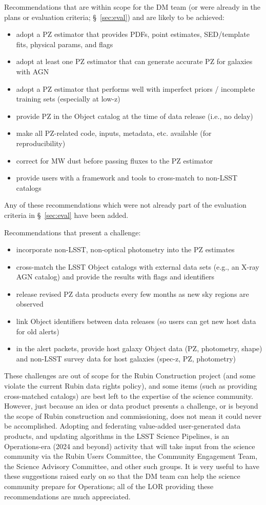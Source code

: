\documentclass[DM,authoryear,toc]{lsstdoc}
\begin{document}
Recommendations that are within scope for the DM team (or were already in the plans or evaluation criteria; \S~\ref{sec:eval}) and are likely to be achieved:
\begin{itemize}
\item adopt a PZ estimator that provides PDFs, point estimates, SED/template fits, physical params, and flags
\item adopt at least one PZ estimator that can generate accurate PZ for galaxies with AGN
\item adopt a PZ estimator that performs well with imperfect priors / incomplete training sets (especially at low-z) 
\item provide PZ in the Object catalog at the time of data release (i.e., no delay)
\item make all PZ-related code, inputs, metadata, etc. available (for reproducibility)
\item correct for MW dust before passing fluxes to the PZ estimator
\item provide users with a framework and tools to cross-match to non-LSST catalogs
\end{itemize}
Any of these recommendations which were not already part of the evaluation criteria in \S~\ref{sec:eval} have been added.

Recommendations that present a challenge:
\begin{itemize}
\item incorporate non-LSST, non-optical photometry into the PZ estimates
\item cross-match the LSST Object catalogs with external data sets (e.g., an X-ray AGN catalog) and provide the results with flags and identifiers
\item release revised PZ data products every few months as new sky regions are observed
\item link Object identifiers between data releases (so users can get new host data for old alerts)
\item in the alert packets, provide host galaxy Object data (PZ, photometry, shape) and non-LSST survey data for host galaxies (spec-z, PZ, photometry)
\end{itemize}
These challenges are out of scope for the Rubin Construction project (and some violate the current Rubin data rights policy), and some items (such as providing cross-matched catalogs) are best left to the expertise of the science community.
However, just because an idea or data product presents a challenge, or is beyond the scope of Rubin construction and commissioning, does not mean it could never be accomplished.
Adopting and federating value-added user-generated data products, and updating algorithms in the LSST Science Pipelines, is an Operations-era (2024 and beyond) activity that will take input from the science community via the Rubin Users Committee, the Community Engagement Team, the Science Advisory Committee, and other such groups.
It is very useful to have these suggestions raised early on so that the DM team can help the science community prepare for Operations; all of the LOR providing these recommendations are much appreciated.
\end{document}
